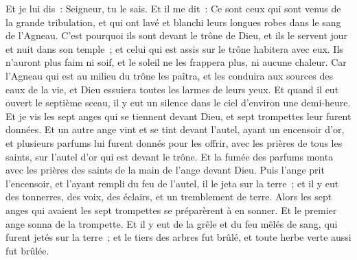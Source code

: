 \begin{multicols}{2}
Et je lui dis~: Seigneur, tu le sais. Et il me dit~: Ce sont ceux qui sont venus de la grande tribulation, et qui ont lavé et blanchi leurs longues robes dans le sang de l'Agneau.
C'est pourquoi ils sont devant le trône de Dieu, et ils le servent jour et nuit dans son temple~; et celui qui est assis sur le trône habitera avec eux.
Ils n'auront plus faim ni soif, et le soleil ne les frappera plus, ni aucune chaleur.
Car l'Agneau qui est au milieu du trône les paîtra, et les conduira aux sources des eaux de la vie, et Dieu essuiera toutes les larmes de leurs yeux.
\VerseOne{}Et quand il eut ouvert le septième sceau, il y eut un silence dans le ciel d'environ une demi-heure.
Et je vis les sept anges qui se tiennent devant Dieu, et sept trompettes leur furent données.
Et un autre ange vint et se tint devant l'autel, ayant un encensoir d'or, et plusieurs parfums lui furent donnés pour les offrir, avec les prières de tous les saints, sur l'autel d'or qui est devant le trône.
Et la fumée des parfums monta avec les prières des saints de la main de l'ange devant Dieu.
Puis l'ange prit l'encensoir, et l'ayant rempli du feu de l'autel, il le jeta sur la terre~; et il y eut des tonnerres, des voix, des éclairs, et un tremblement de terre.
Alors les sept anges qui avaient les sept trompettes se préparèrent à en sonner.
Et le premier ange sonna de la trompette. Et il y eut de la grêle et du feu mêlés de sang, qui furent jetés sur la terre~; et le tiers des arbres fut brûlé, et toute herbe verte aussi fut brûlée.

\end{multicols}
